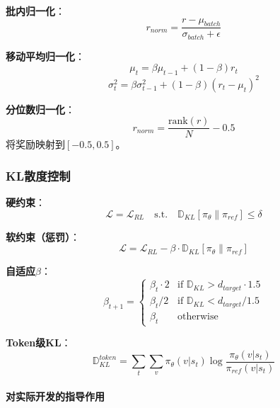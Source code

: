 \documentclass[12pt,a4paper]{article}
\begin{document}
\textbf{批内归一化}：
\begin{equation}
r_{norm} = \frac{r - \mu_{batch}}{\sigma_{batch} + \epsilon}
\end{equation}

\textbf{移动平均归一化}：
\begin{equation}
\mu_t = \beta \mu_{t-1} + (1-\beta) r_t
\end{equation}
\begin{equation}
\sigma_t^2 = \beta \sigma_{t-1}^2 + (1-\beta) (r_t - \mu_t)^2
\end{equation}

\textbf{分位数归一化}：
\begin{equation}
r_{norm} = \frac{\text{rank}(r)}{N} - 0.5
\end{equation}
将奖励映射到$[-0.5, 0.5]$。

\subsubsection{KL散度控制}

\textbf{硬约束}：
\begin{equation}
\mathcal{L} = \mathcal{L}_{RL} \quad \text{s.t.} \quad \mathbb{D}_{KL}[\pi_\theta \| \pi_{ref}] \leq \delta
\end{equation}

\textbf{软约束（惩罚）}：
\begin{equation}
\mathcal{L} = \mathcal{L}_{RL} - \beta \cdot \mathbb{D}_{KL}[\pi_\theta \| \pi_{ref}]
\end{equation}

\textbf{自适应$\beta$}：
\begin{equation}
\beta_{t+1} = \begin{cases}
\beta_t \cdot 2 & \text{if } \mathbb{D}_{KL} > d_{target} \cdot 1.5 \\
\beta_t / 2 & \text{if } \mathbb{D}_{KL} < d_{target} / 1.5 \\
\beta_t & \text{otherwise}
\end{cases}
\end{equation}

\textbf{Token级KL}：
\begin{equation}
\mathbb{D}_{KL}^{token} = \sum_t \sum_v \pi_\theta(v|s_t) \log \frac{\pi_\theta(v|s_t)}{\pi_{ref}(v|s_t)}
\end{equation}
\paragraph{对实际开发的指导作用}
\end{document}
